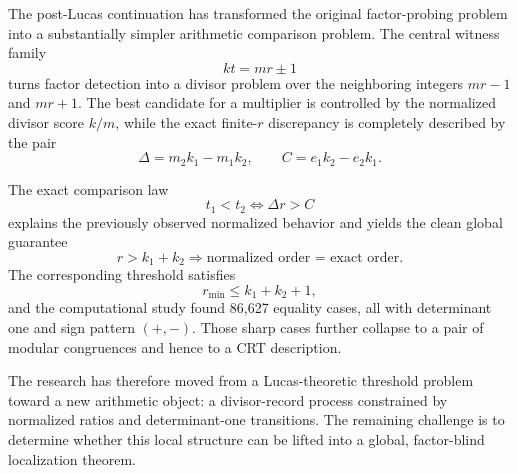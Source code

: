 \documentclass[11pt,a4paper]{article}
\begin{document}
The post-Lucas continuation has transformed the original factor-probing problem into a substantially simpler arithmetic comparison problem. The central witness family
\[
    kt=mr\pm1
\]
turns factor detection into a divisor problem over the neighboring integers $mr-1$ and $mr+1$. The best candidate for a multiplier is controlled by the normalized divisor score $k/m$, while the exact finite-$r$ discrepancy is completely described by the pair
\[
    \Delta=m_2k_1-m_1k_2,
    \qquad
    C=e_1k_2-e_2k_1.
\]

The exact comparison law
\[
    t_1<t_2\iff\Delta r>C
\]
explains the previously observed normalized behavior and yields the clean global guarantee
\[
    r>k_1+k_2
    \Longrightarrow
    \text{normalized order = exact order}.
\]
The corresponding threshold satisfies
\[
    r_{\min}\le k_1+k_2+1,
\]
and the computational study found 86,627 equality cases, all with determinant one and sign pattern $(+,-)$. Those sharp cases further collapse to a pair of modular congruences and hence to a CRT description.

The research has therefore moved from a Lucas-theoretic threshold problem toward a new arithmetic object: a divisor-record process constrained by normalized ratios and determinant-one transitions. The remaining challenge is to determine whether this local structure can be lifted into a global, factor-blind localization theorem.
\end{document}
